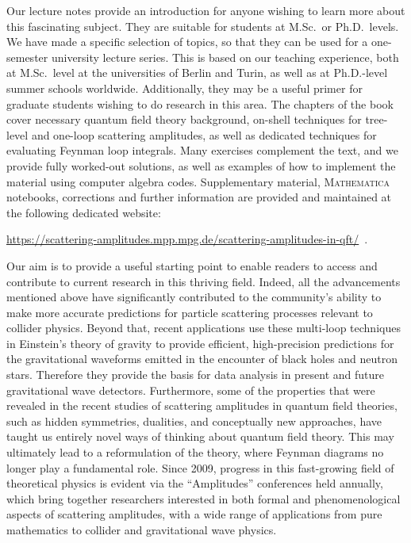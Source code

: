 Our lecture notes provide an introduction for anyone wishing to learn more about this fascinating subject.
They are suitable for students at M.Sc.\ or Ph.D.\ levels.
We have made a specific selection of topics, so that they can be used for a one-semester university lecture series. This is based on our teaching experience, both at M.Sc.\ level at the universities of Berlin and Turin, as well as at Ph.D.-level summer schools worldwide. Additionally, they may be a useful primer for graduate students wishing to do research in this area. 
The chapters of the book cover necessary quantum field theory background, on-shell techniques for tree-level and one-loop scattering amplitudes, as well as dedicated techniques for evaluating Feynman loop integrals. 
Many exercises complement the text, and we provide fully worked-out solutions, as well as examples of how to implement the material using computer algebra codes. 
Supplementary material, \textsc{Mathematica} notebooks, corrections and further information are provided and maintained at the following 
dedicated website:
\begin{center}
\href{https://scattering-amplitudes.mpp.mpg.de/scattering-amplitudes-in-qft/}{https://scattering-amplitudes.mpp.mpg.de/scattering-amplitudes-in-qft/} \,.
\end{center}


\smallskip
Our aim is to provide a useful starting point to enable readers to access and contribute to current research in this thriving field.
Indeed, all the advancements mentioned above have significantly contributed to the community's ability to make more accurate predictions for particle scattering processes relevant to collider physics.
Beyond that, recent applications use these multi-loop techniques in Einstein's theory of gravity to provide efficient, high-precision predictions for the gravitational waveforms emitted in the encounter of black holes and
neutron stars. Therefore they provide the basis for data analysis in present and future gravitational wave detectors.
Furthermore, some of the properties that were revealed in the recent studies of scattering amplitudes in quantum field theories, 
such as hidden symmetries, dualities, and conceptually new approaches, 
have taught us entirely novel ways of thinking about quantum field theory. 
This may ultimately lead to a reformulation of the theory, where Feynman diagrams no longer play a fundamental role.
Since 2009, progress in this fast-growing field of theoretical physics is evident via the ``Amplitudes'' conferences held annually, which bring together researchers 
interested in both formal and phenomenological aspects of scattering amplitudes, with a wide range of applications from pure mathematics to collider and gravitational wave physics. 


